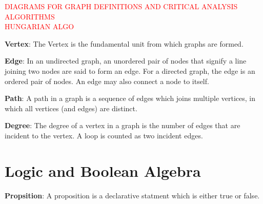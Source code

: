 \textcolor{red} {DIAGRAMS FOR GRAPH DEFINITIONS  AND CRITICAL ANALYSIS ALGORITHMS}\\
\textcolor{red}{HUNGARIAN ALGO}
\begin{defn}\label{mod1:defn:Vertex}
	\textbf{Vertex}: The Vertex is the fundamental unit from which graphs are formed.
\end{defn}

\begin{defn}\label{mod1:defn:Edge}
	\textbf{Edge}: In an undirected graph, an unordered pair of nodes that signify  a line joining  two nodes are said to form an edge. For a directed graph, the edge is an ordered pair of nodes. An edge may also connect a node to itself.
\end{defn}

\begin{defn}\label{mod1:defn:Path}
	 \textbf{Path}: A path in a graph is a sequence of edges which joins multiple vertices, in which all vertices (and edges) are distinct.
\end{defn}

\begin{defn}\label{mod1:defn:Degree}
	\textbf{Degree}: The degree of a vertex  in a graph is the number of edges that are incident to the vertex. A loop is counted as two incident edges.
\end{defn}


\section{Logic and Boolean Algebra}

\begin{defn}\label{mod1:defn:Proposition}
	\textbf{Propsition}: A proposition is a declarative statment which is either true or false.
\end{defn}

